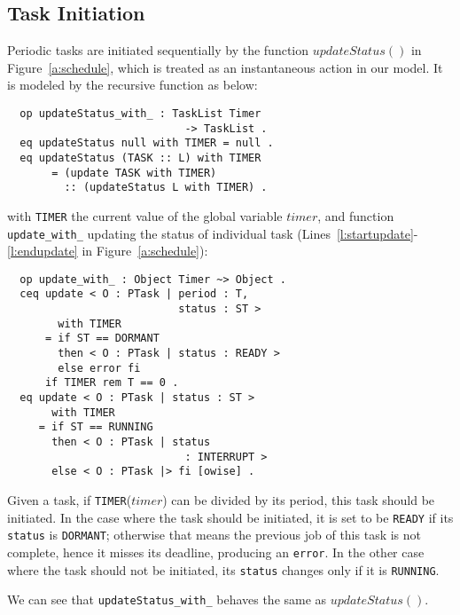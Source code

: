 \documentclass[10pt,journal,compsoc]{IEEEtran}
\begin{document}
\subsection{Task Initiation}
\label{ss:init}
Periodic tasks are initiated sequentially by the function
$updateStatus()$ in Figure~\ref{a:schedule}, which is treated as an
instantaneous action in our model. It is modeled by the recursive
function as below:
\begin{verbatim}
  op updateStatus_with_ : TaskList Timer 
                            -> TaskList . 
  eq updateStatus null with TIMER = null .
  eq updateStatus (TASK :: L) with TIMER
       = (update TASK with TIMER) 
         :: (updateStatus L with TIMER) .
\end{verbatim}
with \verb|TIMER| the current value of the global variable $timer$,
and function \verb|update_with_| updating the status of individual
task (Lines~\ref{l:startupdate}-\ref{l:endupdate} in
Figure~\ref{a:schedule}):
\begin{verbatim}
  op update_with_ : Object Timer ~> Object .
  ceq update < O : PTask | period : T, 
                           status : ST > 
        with TIMER
      = if ST == DORMANT 
        then < O : PTask | status : READY >
        else error fi
      if TIMER rem T == 0 .
  eq update < O : PTask | status : ST > 
       with TIMER
     = if ST == RUNNING 
       then < O : PTask | status 
                            : INTERRUPT >
       else < O : PTask |> fi [owise] .
\end{verbatim}
Given a task, if \verb|TIMER|($timer$) can be divided by its period,
this task should be initiated.  In the case where the task should be
initiated, it is set to be \verb|READY| if its \verb|status| is
\verb|DORMANT|; otherwise that means the previous job of this task is
not complete, hence it misses its deadline, producing an
\verb|error|. In the other case where the task should not be
initiated, its \verb|status| changes only if it is \verb|RUNNING|. 

We can see that \verb|updateStatus_with_| behaves the same as
$updateStatus()$.
\end{document}
